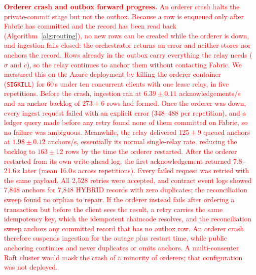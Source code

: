 \documentclass[final,5p,times,twocolumn]{elsarticle}
\begin{document}
\textcolor{red}{\textbf{Orderer crash and outbox forward progress.} An orderer crash halts the private-commit stage but not the outbox. Because a row is enqueued only after Fabric has committed and the record has been read back (Algorithm~\ref{alg:routing}), no new rows can be created while the orderer is down, and ingestion fails closed: the orchestrator returns an error and neither stores nor anchors the record. Rows already in the outbox carry everything the relay needs ($\sigma$ and $c$), so the relay continues to anchor them without contacting Fabric. We measured this on the Azure deployment by killing the orderer container (\texttt{SIGKILL}) for 60\,s under ten concurrent clients with one lease relay, in five repetitions. Before the crash, ingestion ran at $6.39\pm0.11$ acknowledgements/s and an anchor backlog of $273\pm6$ rows had formed. Once the orderer was down, every ingest request failed with an explicit error (348--488 per repetition), and a ledger query made before any retry found none of them committed on Fabric, so no failure was ambiguous. Meanwhile, the relay delivered $125\pm9$ queued anchors at $1.98\pm0.12$ anchors/s, essentially its normal single-relay rate, reducing the backlog to $163\pm12$ rows by the time the orderer restarted. After the orderer restarted from its own write-ahead log, the first acknowledgement returned 7.8--21.6\,s later (mean 16.0\,s across repetitions). Every failed request was retried with the same payload. All 2{,}528 retries were accepted, and contract event logs showed 7{,}848 anchors for 7{,}848 HYBRID records with zero duplicates; the reconciliation sweep found no orphan to repair. If the orderer instead fails after ordering a transaction but before the client sees the result, a retry carries the same idempotency key, which the idempotent chaincode resolves, and the reconciliation sweep anchors any committed record that has no outbox row. An orderer crash therefore suspends ingestion for the outage plus restart time, while public anchoring continues and never duplicates or omits anchors. A multi-consenter Raft cluster would mask the crash of a minority of orderers; that configuration was not deployed.}

\iffalse
\end{document}

